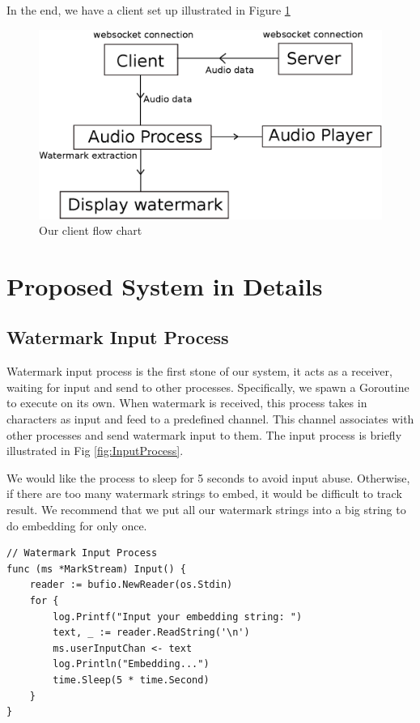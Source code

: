 In the end, we have a client set up illustrated in Figure \ref{fig:Client}

\begin{figure}[bt]
\center
\includegraphics[width=.9\columnwidth]{client.eps}
\caption{Our client flow chart}
\label{fig:Client}
\end{figure}

\section{Proposed System in Details}
\subsection{Watermark Input Process}
Watermark input process is the first stone of our system, it acts as a receiver, waiting for input and send to other processes. Specifically, we spawn a Goroutine to execute on its own. When watermark is received, this process takes in characters as input and feed to a predefined channel. This channel associates with other processes and send watermark input to them. The input process is briefly illustrated in Fig \ref{fig:InputProcess}.

We would like the process to sleep for 5 seconds to avoid input abuse. Otherwise, if there are too many watermark strings to embed, it would be difficult to track result. We recommend that we put all our watermark strings into a big string to do embedding for only once.

\begin{lstlisting}
// Watermark Input Process
func (ms *MarkStream) Input() {
	reader := bufio.NewReader(os.Stdin)
	for {
		log.Printf("Input your embedding string: ")
		text, _ := reader.ReadString('\n')
		ms.userInputChan <- text
		log.Println("Embedding...")
		time.Sleep(5 * time.Second)
	}
}
\end{lstlisting}

